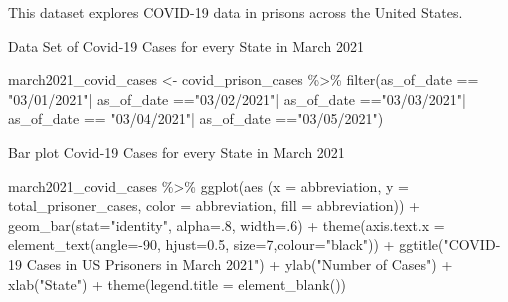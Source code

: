 \documentclass[
]{article}
\newenvironment{Shaded}{\begin{snugshade}}{\end{snugshade}}
\newcommand{\AttributeTok}[1]{\textcolor[rgb]{0.77,0.63,0.00}{#1}}
\newcommand{\DecValTok}[1]{\textcolor[rgb]{0.00,0.00,0.81}{#1}}
\newcommand{\FloatTok}[1]{\textcolor[rgb]{0.00,0.00,0.81}{#1}}
\newcommand{\FunctionTok}[1]{\textcolor[rgb]{0.00,0.00,0.00}{#1}}
\newcommand{\NormalTok}[1]{#1}
\newcommand{\OtherTok}[1]{\textcolor[rgb]{0.56,0.35,0.01}{#1}}
\newcommand{\SpecialCharTok}[1]{\textcolor[rgb]{0.00,0.00,0.00}{#1}}
\newcommand{\StringTok}[1]{\textcolor[rgb]{0.31,0.60,0.02}{#1}}
\begin{document}
This dataset explores COVID-19 data in prisons across the United States.

Data Set of Covid-19 Cases for every State in March 2021

\begin{Shaded}
\begin{Highlighting}[]
\NormalTok{march2021\_covid\_cases }\OtherTok{\textless{}{-}}\NormalTok{ covid\_prison\_cases }\SpecialCharTok{\%\textgreater{}\%}
  \FunctionTok{filter}\NormalTok{(as\_of\_date }\SpecialCharTok{==} \StringTok{"03/01/2021"}\SpecialCharTok{|} 
\NormalTok{        as\_of\_date }\SpecialCharTok{==}\StringTok{"03/02/2021"}\SpecialCharTok{|} 
\NormalTok{        as\_of\_date }\SpecialCharTok{==}\StringTok{"03/03/2021"}\SpecialCharTok{|} 
\NormalTok{        as\_of\_date }\SpecialCharTok{==} \StringTok{"03/04/2021"}\SpecialCharTok{|} 
\NormalTok{        as\_of\_date }\SpecialCharTok{==}\StringTok{"03/05/2021"}\NormalTok{) }
\end{Highlighting}
\end{Shaded}

Bar plot Covid-19 Cases for every State in March 2021

\begin{Shaded}
\begin{Highlighting}[]
\NormalTok{march2021\_covid\_cases }\SpecialCharTok{\%\textgreater{}\%}
  \FunctionTok{ggplot}\NormalTok{(aes}
\NormalTok{         (}\AttributeTok{x =}\NormalTok{ abbreviation, }
          \AttributeTok{y =}\NormalTok{ total\_prisoner\_cases,}
          \AttributeTok{color =}\NormalTok{ abbreviation,}
           \AttributeTok{fill =}\NormalTok{ abbreviation)) }\SpecialCharTok{+}
  \FunctionTok{geom\_bar}\NormalTok{(}\AttributeTok{stat=}\StringTok{"identity"}\NormalTok{, }\AttributeTok{alpha=}\NormalTok{.}\DecValTok{8}\NormalTok{, }\AttributeTok{width=}\NormalTok{.}\DecValTok{6}\NormalTok{) }\SpecialCharTok{+}
  \FunctionTok{theme}\NormalTok{(}\AttributeTok{axis.text.x  =} \FunctionTok{element\_text}\NormalTok{(}\AttributeTok{angle=}\SpecialCharTok{{-}}\DecValTok{90}\NormalTok{, }\AttributeTok{hjust=}\FloatTok{0.5}\NormalTok{, }\AttributeTok{size=}\DecValTok{7}\NormalTok{,}\AttributeTok{colour=}\StringTok{"black"}\NormalTok{)) }\SpecialCharTok{+}
  \FunctionTok{ggtitle}\NormalTok{(}\StringTok{"COVID{-}19 Cases in US Prisoners in March 2021"}\NormalTok{) }\SpecialCharTok{+}
  \FunctionTok{ylab}\NormalTok{(}\StringTok{"Number of Cases"}\NormalTok{) }\SpecialCharTok{+}
  \FunctionTok{xlab}\NormalTok{(}\StringTok{"State"}\NormalTok{) }\SpecialCharTok{+}
  \FunctionTok{theme}\NormalTok{(}\AttributeTok{legend.title =} \FunctionTok{element\_blank}\NormalTok{())}
\end{Highlighting}
\end{Shaded}
\end{document}
